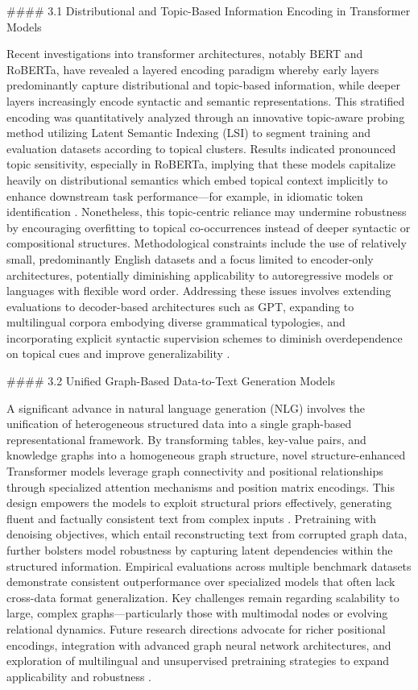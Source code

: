 \documentclass[11pt]{article}
\begin{document}
#### 3.1 Distributional and Topic-Based Information Encoding in Transformer Models

Recent investigations into transformer architectures, notably BERT and RoBERTa, have revealed a layered encoding paradigm whereby early layers predominantly capture distributional and topic-based information, while deeper layers increasingly encode syntactic and semantic representations. This stratified encoding was quantitatively analyzed through an innovative topic-aware probing method utilizing Latent Semantic Indexing (LSI) to segment training and evaluation datasets according to topical clusters. Results indicated pronounced topic sensitivity, especially in RoBERTa, implying that these models capitalize heavily on distributional semantics which embed topical context implicitly to enhance downstream task performance—for example, in idiomatic token identification \cite{ref44}. Nonetheless, this topic-centric reliance may undermine robustness by encouraging overfitting to topical co-occurrences instead of deeper syntactic or compositional structures. Methodological constraints include the use of relatively small, predominantly English datasets and a focus limited to encoder-only architectures, potentially diminishing applicability to autoregressive models or languages with flexible word order. Addressing these issues involves extending evaluations to decoder-based architectures such as GPT, expanding to multilingual corpora embodying diverse grammatical typologies, and incorporating explicit syntactic supervision schemes to diminish overdependence on topical cues and improve generalizability \cite{ref44}.

#### 3.2 Unified Graph-Based Data-to-Text Generation Models

A significant advance in natural language generation (NLG) involves the unification of heterogeneous structured data into a single graph-based representational framework. By transforming tables, key-value pairs, and knowledge graphs into a homogeneous graph structure, novel structure-enhanced Transformer models leverage graph connectivity and positional relationships through specialized attention mechanisms and position matrix encodings. This design empowers the models to exploit structural priors effectively, generating fluent and factually consistent text from complex inputs \cite{ref46}. Pretraining with denoising objectives, which entail reconstructing text from corrupted graph data, further bolsters model robustness by capturing latent dependencies within the structured information. Empirical evaluations across multiple benchmark datasets demonstrate consistent outperformance over specialized models that often lack cross-data format generalization. Key challenges remain regarding scalability to large, complex graphs—particularly those with multimodal nodes or evolving relational dynamics. Future research directions advocate for richer positional encodings, integration with advanced graph neural network architectures, and exploration of multilingual and unsupervised pretraining strategies to expand applicability and robustness \cite{ref46}.
\end{document}
